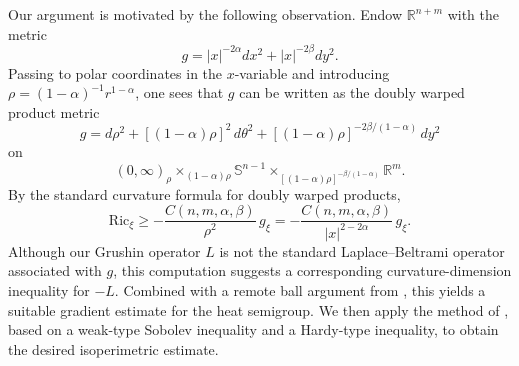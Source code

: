 \documentclass[12pt]{amsart}
\theoremstyle{plain}
\theoremstyle{definition}
\numberwithin{equation}{section}
\begin{document}


Our argument is motivated by the following observation. Endow \(\mathbb{R}^{n+m}\) with the metric
\[
g=|x|^{-2\alpha}dx^2+|x|^{-2\beta}dy^2.
\]
Passing to polar coordinates in the \(x\)-variable and introducing $\rho=(1-\alpha)^{-1}r^{1-\alpha}$, one sees that \(g\) can be written as the doubly warped product metric
\[
g=d\rho^2+[(1-\alpha)\rho]^2\,d\theta^2+[(1-\alpha)\rho]^{-2\beta/(1-\alpha)}\,dy^2
\]
on
\[
(0,\infty)_\rho\times_{(1-\alpha)\rho}\mathbb{S}^{n-1}\times_{[(1-\alpha)\rho]^{-\beta/(1-\alpha)}}\mathbb{R}^m.
\]
By the standard curvature formula for doubly warped products,
\[
\textrm{Ric}_\xi \ge -\frac{C(n,m,\alpha,\beta)}{\rho^2}\,g_\xi
= -\frac{C(n,m,\alpha,\beta)}{|x|^{2-2\alpha}}\,g_\xi.
\]
Although our Grushin operator \(L\) is not the standard Laplace--Beltrami operator associated with \(g\), this computation suggests a corresponding curvature-dimension inequality for \(-L\). Combined with a remote ball argument from \cite{Gilles}, this yields a suitable gradient estimate for the heat semigroup. We then apply the method of \cite{He_ISO}, based on a weak-type Sobolev inequality and a Hardy-type inequality, to obtain the desired isoperimetric estimate.
\end{document}
